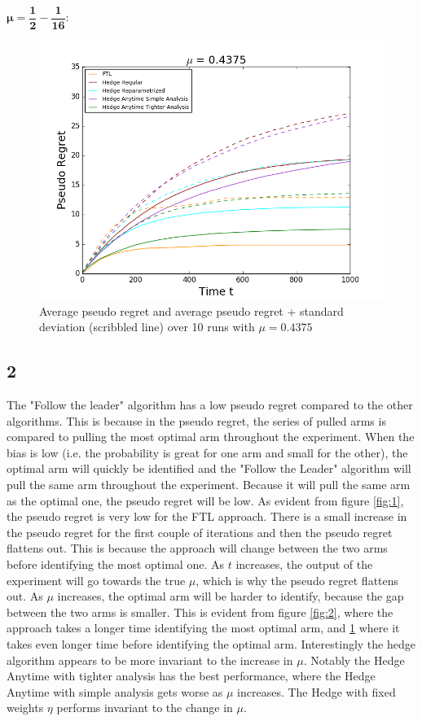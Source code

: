 \documentclass{article}
\begin{document}
$\mathbf{\mu = \dfrac{1}{2} - \dfrac{1}{16}} $:
\begin{figure}[H]
 \centering
  \includegraphics[width=17cm]{fig/2_new.png}
  \caption{\footnotesize Average pseudo regret and average pseudo regret + standard deviation (scribbled line) over 10 runs with $\mu = 0.4375$ }
\label{fig:3}
\end{figure}
\subsection{2}
The "Follow the leader" algorithm has a low pseudo regret compared to the other algorithms. This is because in the pseudo regret, the series of pulled arms is compared to pulling the most optimal arm throughout the experiment. When the bias is low (i.e. the probability is great for one arm and small for the other), the optimal arm will quickly be identified and the "Follow the Leader" algorithm will pull the same arm throughout the experiment. Because it will pull the same arm as the optimal one, the pseudo regret will be low. As evident from figure \ref{fig:1}, the pseudo regret is very low for the FTL approach. There is a small increase in the pseudo regret for the first couple of iterations and then the pseudo regret flattens out. This is because the approach will change between the two arms before identifying the most optimal one. As $t$ increases, the output of the experiment will go towards the true $\mu$, which is why the pseudo regret flattens out. As $\mu$ increases, the optimal arm will be harder to identify, because the gap between the two arms is smaller. This is evident from figure \ref{fig:2}, where the approach takes a longer time identifying the most optimal arm, and \ref{fig:3} where it takes even longer time before identifying the optimal arm. Interestingly the hedge algorithm appears to be more invariant to the increase in $\mu$. Notably the Hedge Anytime with tighter analysis has the best performance, where the Hedge Anytime with simple analysis gets worse as $\mu$ increases. The Hedge with fixed weights $\eta$ performs invariant to the change in $\mu$.
\end{document}
